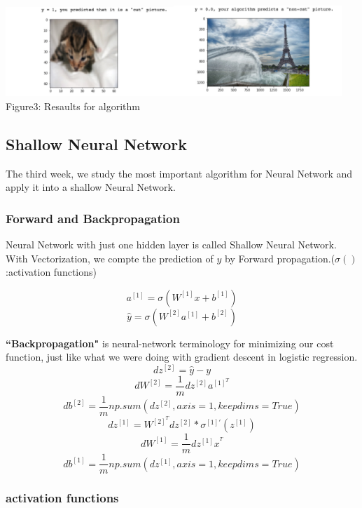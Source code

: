 \documentclass[a4paper]{article}
\begin{document}
\begin{center}
\includegraphics[width=2.5in]{reslogi.png}\includegraphics[width=2.5in]{reslogi2.png}\\
Figure3: Resaults for algorithm
\end{center}

\newpage

\subsection{\textbf{Shallow Neural Network}}

The third week, we study the most important algorithm for Neural Network and apply it into a shallow Neural Network.

\subsubsection{\textbf{Forward and Backpropagation}}

Neural Network with just one hidden layer is called Shallow Neural Network. With Vectorization, we compte the prediction of $y$ by Forward propagation.($\sigma( )$:activation functions)

$$a^{[1]}=\sigma (W^{[1]}x+b^{[1]})$$
$$\hat{y}=\sigma (W^{[2]}a^{[1]}+b^{[2]})$$

\textbf{``Backpropagation"} is neural-network terminology for minimizing our cost function, just like what we were doing with gradient descent in logistic regression. 
$$dz^{[2]}=\hat{y}-y$$
$$dW^{[2]}=\frac{1}{m}dz^{[2]}a^{[1]^T}$$
$$db^{[2]}=\frac{1}{m}np.sum(dz^{[2]},axis=1,keepdims=True)$$
$$dz^{[1]}=W^{[2]^T}dz^{[2]}*\sigma^{[1]'} (z^{[1]})$$
$$dW^{[1]}=\frac{1}{m}dz^{[1]}x^{^T}$$
$$db^{[1]}=\frac{1}{m}np.sum(dz^{[1]},axis=1,keepdims=True)$$

\subsubsection{\textbf{activation functions}}
\end{document}
